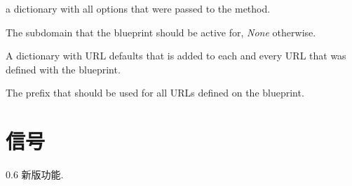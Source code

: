 \documentclass[a4paper,12pt]{sphinxmanual}
\begin{document}
\begin{fulllineitems}
\begin{fulllineitems}
\end{fulllineitems}


\begin{fulllineitems}
\label{api:flask.blueprints.BlueprintSetupState.options}
a dictionary with all options that were passed to the
{\hyperref[api:flask.Flask.register_blueprint]{}} method.

\end{fulllineitems}


\begin{fulllineitems}
\label{api:flask.blueprints.BlueprintSetupState.subdomain}
The subdomain that the blueprint should be active for, \emph{None}
otherwise.

\end{fulllineitems}


\begin{fulllineitems}
\label{api:flask.blueprints.BlueprintSetupState.url_defaults}
A dictionary with URL defaults that is added to each and every
URL that was defined with the blueprint.

\end{fulllineitems}


\begin{fulllineitems}
\label{api:flask.blueprints.BlueprintSetupState.url_prefix}
The prefix that should be used for all URLs defined on the
blueprint.

\end{fulllineitems}


\end{fulllineitems}



\section{信号}
\label{api:id15}0.6 新版功能.
\end{document}
